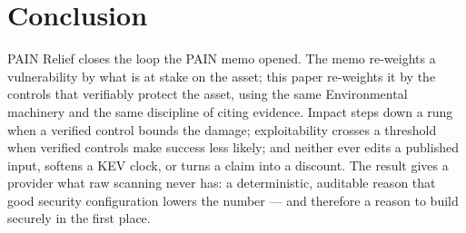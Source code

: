\documentclass[11pt]{article}
\begin{document}
\section{Conclusion}
PAIN Relief closes the loop the PAIN memo opened. The memo re-weights a
vulnerability by what is at stake on the asset; this paper re-weights it by the
controls that verifiably protect the asset, using the same Environmental
machinery and the same discipline of citing evidence. Impact steps down a rung
when a verified control bounds the damage; exploitability crosses a threshold when
verified controls make success less likely; and neither ever edits a published
input, softens a KEV clock, or turns a claim into a discount. The result gives a
provider what raw scanning never has: a deterministic, auditable reason that good
security configuration lowers the number --- and therefore a reason to build
securely in the first place.
\end{document}
